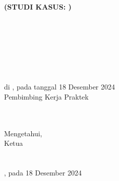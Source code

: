 %


%


\chapter*{\lembarPengesahanProdi}
\begin{center}
  \fontsize{14pt}{16.8pt}\selectfont\MakeUppercase{\bo{\judul}}\\
  \bfseries(STUDI KASUS: \namaInstansi)
  
  \vspace{1.5cm}
  \fontsize{14pt}{16.8pt}\selectfont\MakeUppercase{\bo {\tipeta}}\\
  \vspace{1.5cm}

  \\
  \MakeUppercase{\bo{\underline{\penulis}}}\\
  \MakeUppercase{\bo{\nim}}\\
  \vspace{1.2cm}

  \fontsize{12pt}{14.4pt}\selectfont {}\\
  \fontsize{12pt}{14.4pt}\selectfont di \kota, pada tanggal 18 Desember 2024\\
  \vspace{0.5cm}
  Pembimbing Kerja Praktek
  \vspace{1.5cm}

  {\bo{\underline{\pembimbingpertama}}}\\
  {}\\

  \vspace{1.2cm}
  Mengetahui,\\
  Ketua \programStudi\\
  \fakultas\\
  \universitas\\
  \kota, pada 18 Desember 2024
  \vspace{1.5cm}

  {\bo{\underline{\kaprodi}}}\\
  {\bo{{\kaprodinip}}}\\


\end{center}
